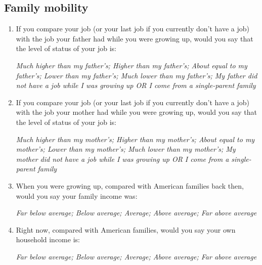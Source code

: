 \documentclass[11pt, headsepline]{article}
\begin{document}
\subsection{Family mobility}

\begin{enumerate}[resume]
    \item If you compare your job (or your last job if you currently don’t have a job) with the job your father had while you were growing up, would you say that the level of status of your job is:

    \textit{Much higher than my father’s; Higher than my father’s; About equal to my father’s; Lower than my father’s; Much lower than my father’s; My father did not have a job while I was growing up OR I come from a single-parent family}

    \item If you compare your job (or your last job if you currently don’t have a job) with the job your mother had while you were growing up, would you say that the level of status of your job is:

    \textit{Much higher than my mother’s; Higher than my mother’s; About equal to my mother’s; Lower than my mother’s; Much lower than my mother’s; My mother did not have a job while I was growing up OR I come from a single-parent family}

    \item When you were growing up, compared with American families back then, would you say your family income was:

    \textit{Far below average; Below average; Average; Above average; Far above average}

    \item Right now, compared with American families, would you say your own household income is:

    \textit{Far below average; Below average; Average; Above average; Far above average}
\end{enumerate}

\end{document}
